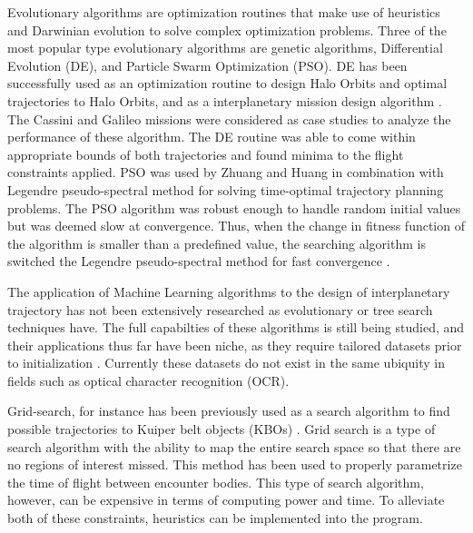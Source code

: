 \documentclass[letterpaper, preprint, paper,11pt]{AAS}	%
\begin{document}
Evolutionary algorithms are optimization routines that make use of heuristics and Darwinian evolution to solve complex optimization problems. Three of the most popular type evolutionary algorithms are genetic algorithms, Differential Evolution (DE), and Particle Swarm Optimization (PSO). DE has been successfully used as an optimization routine to design Halo Orbits and optimal trajectories to Halo Orbits, and as a interplanetary mission design algorithm \cite{Nath2016, Olds2007}.  The Cassini and Galileo missions were considered as case studies to analyze the performance of these algorithm. The DE routine was able to come within appropriate bounds of both trajectories and found minima to the flight constraints applied. PSO was used by Zhuang and Huang in combination with Legendre pseudo-spectral method for solving time-optimal trajectory planning problems. The PSO algorithm was robust enough to handle random initial values but was deemed slow at convergence. Thus, when the change in fitness function of the algorithm is smaller than a predefined value, the searching algorithm is switched the Legendre pseudo-spectral method for fast convergence \cite{Zhuang2014}.  

The application of Machine Learning algorithms to the design of interplanetary trajectory has not been extensively researched as evolutionary or tree search techniques have. The full capabilties of these algorithms is still being studied, and their applications thus far have been niche, as they require tailored datasets prior to initialization \cite{Izzo2019}. Currently these datasets do not exist in the same ubiquity in fields such as optical character recognition (OCR).

Grid-search, for instance has been previously used as a search algorithm to find possible trajectories to Kuiper belt objects (KBOs) \cite{Penas2019}. Grid search is a type of search algorithm with the ability to map the entire search space so that there are no regions of interest missed. This method has been used to properly parametrize the time of flight between encounter bodies. This type of search algorithm, however, can be expensive in terms of computing power and time. To alleviate both of these constraints, heuristics can be implemented into the program.  
\end{document}
